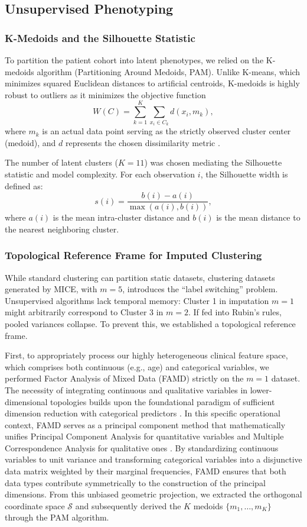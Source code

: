 \documentclass[a4paper,11pt,twocolumn]{article}
\begin{document}
	\subsection{Unsupervised Phenotyping}
	
	\subsubsection{K-Medoids and the Silhouette Statistic}
	To partition the patient cohort into latent phenotypes, we relied on the K-medoids algorithm (Partitioning Around Medoids, PAM). Unlike K-means, which minimizes squared Euclidean distances to artificial centroids, K-medoids is highly robust to outliers as it minimizes the objective function
	$$ W(C) = \sum_{k=1}^K \sum_{x_i \in C_k} d(x_i, m_k), $$
	where $m_k$ is an actual data point serving as the strictly observed cluster center (medoid), and $d$ represents the chosen dissimilarity metric \cite{Kaufman1990}. 
	
	The number of latent clusters ($K=11$) was chosen mediating the Silhouette statistic \cite{Rousseeuw1987} and model complexity. For each observation $i$, the Silhouette width is defined as:
	$$ s(i) = \frac{b(i) - a(i)}{\max(a(i), b(i))}, $$
	where $a(i)$ is the mean intra-cluster distance and $b(i)$ is the mean distance to the nearest neighboring cluster.
	
	\subsubsection{Topological Reference Frame for Imputed Clustering}
	While standard clustering can partition static datasets, clustering datasets generated by MICE, with $m=5$, introduces the ``label switching'' problem. Unsupervised algorithms lack temporal memory: Cluster 1 in imputation $m=1$ might arbitrarily correspond to Cluster 3 in $m=2$. If fed into Rubin's rules, pooled variances collapse. To prevent this, we established a topological reference frame.
	
	First, to appropriately process our highly heterogeneous clinical feature space, which comprises both continuous (e.g., age) and categorical variables, we performed Factor Analysis of Mixed Data (FAMD) strictly on the $m=1$ dataset. The necessity of integrating continuous and qualitative variables in lower-dimensional topologies builds upon the foundational paradigm of sufficient dimension reduction with categorical predictors \cite{Chiaromonte2002}. In this specific operational context, FAMD serves as a principal component method that mathematically unifies Principal Component Analysis for quantitative variables and Multiple Correspondence Analysis for qualitative ones \cite{Pages2004}. By standardizing continuous variables to unit variance and transforming categorical variables into a disjunctive data matrix weighted by their marginal frequencies, FAMD ensures that both data types contribute symmetrically to the construction of the principal dimensions. From this unbiased geometric projection, we extracted the orthogonal coordinate space $\mathcal{S}$ and subsequently derived the $K$ medoids $\{m_1, \dots, m_K\}$ through the PAM algorithm.
	
\end{document}
